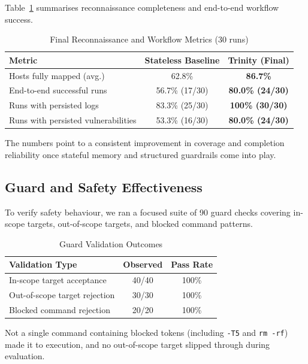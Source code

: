 \documentclass[conference]{IEEEtran}
\begin{document}
Table~\ref{tab:final_recon} summarises reconnaissance completeness and end-to-end workflow success.

\begin{table}[h]
\centering
\caption{Final Reconnaissance and Workflow Metrics (30 runs)}
\label{tab:final_recon}
\begin{tabular}{lcc}
\toprule
\textbf{Metric} & \textbf{Stateless Baseline} & \textbf{Trinity (Final)} \\
\midrule
Hosts fully mapped (avg.) & 62.8\% & \textbf{86.7\%} \\
End-to-end successful runs & 56.7\% (17/30) & \textbf{80.0\% (24/30)} \\
Runs with persisted logs & 83.3\% (25/30) & \textbf{100\% (30/30)} \\
Runs with persisted vulnerabilities & 53.3\% (16/30) & \textbf{80.0\% (24/30)} \\
\bottomrule
\end{tabular}
\end{table}

The numbers point to a consistent improvement in coverage and completion reliability once stateful memory and structured guardrails come into play.

\subsection{Guard and Safety Effectiveness}

To verify safety behaviour, we ran a focused suite of 90 guard checks covering in-scope targets, out-of-scope targets, and blocked command patterns.

\begin{table}[h]
\centering
\caption{Guard Validation Outcomes}
\label{tab:final_guard}
\begin{tabular}{lcc}
\toprule
\textbf{Validation Type} & \textbf{Observed} & \textbf{Pass Rate} \\
\midrule
In-scope target acceptance & 40/40 & 100\% \\
Out-of-scope target rejection & 30/30 & 100\% \\
Blocked command rejection & 20/20 & 100\% \\
\bottomrule
\end{tabular}
\end{table}

Not a single command containing blocked tokens (including \texttt{-T5} and \texttt{rm -rf}) made it to execution, and no out-of-scope target slipped through during evaluation.
\end{document}
